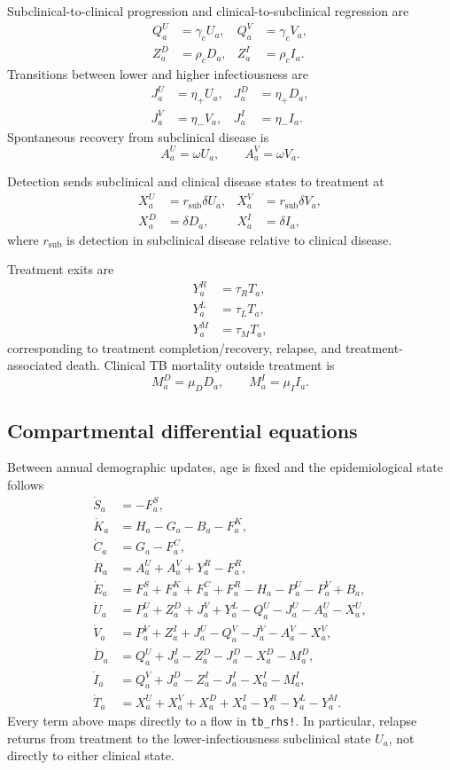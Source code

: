 \documentclass[11pt]{article}
\newcommand{\code}[1]{\texttt{#1}}
\begin{document}
Subclinical-to-clinical progression and clinical-to-subclinical regression are
\begin{align}
Q^U_a&=\gamma_cU_a,& Q^V_a&=\gamma_cV_a,\\
Z^D_a&=\rho_cD_a,& Z^I_a&=\rho_cI_a.
\end{align}
Transitions between lower and higher infectiousness are
\begin{align}
J^U_a&=\eta_+U_a,& J^D_a&=\eta_+D_a,\\
J^V_a&=\eta_-V_a,& J^I_a&=\eta_-I_a.
\end{align}
Spontaneous recovery from subclinical disease is
\begin{equation}
A^U_a=\omega U_a,\qquad A^V_a=\omega V_a.
\end{equation}

Detection sends subclinical and clinical disease states to treatment at
\begin{align}
X^U_a&=r_{\mathrm{sub}}\delta U_a,&
X^V_a&=r_{\mathrm{sub}}\delta V_a,\\
X^D_a&=\delta D_a,&
X^I_a&=\delta I_a,
\end{align}
where $r_{\mathrm{sub}}$ is detection in subclinical disease relative to clinical disease.

Treatment exits are
\begin{align}
Y^R_a&=\tau_R T_a,\\
Y^L_a&=\tau_L T_a,\\
Y^M_a&=\tau_M T_a,
\end{align}
corresponding to treatment completion/recovery, relapse, and treatment-associated death. Clinical TB mortality outside treatment is
\begin{equation}
M^D_a=\mu_DD_a,\qquad M^I_a=\mu_II_a.
\end{equation}

\subsection{Compartmental differential equations}

Between annual demographic updates, age is fixed and the epidemiological state follows
\begin{align}
\dot S_a &= -F^S_a,\\
\dot K_a &= H_a-G_a-B_a-F^K_a,\\
\dot C_a &= G_a-F^C_a,\\
\dot R_a &= A^U_a+A^V_a+Y^R_a-F^R_a,\\
\dot E_a &= F^S_a+F^K_a+F^C_a+F^R_a-H_a-P^U_a-P^V_a+B_a,\\
\dot U_a &= P^U_a+Z^D_a+J^V_a+Y^L_a-Q^U_a-J^U_a-A^U_a-X^U_a,\\
\dot V_a &= P^V_a+Z^I_a+J^U_a-Q^V_a-J^V_a-A^V_a-X^V_a,\\
\dot D_a &= Q^U_a+J^I_a-Z^D_a-J^D_a-X^D_a-M^D_a,\\
\dot I_a &= Q^V_a+J^D_a-Z^I_a-J^I_a-X^I_a-M^I_a,\\
\dot T_a &= X^U_a+X^V_a+X^D_a+X^I_a-Y^R_a-Y^L_a-Y^M_a.
\label{eq:odes}
\end{align}
Every term above maps directly to a flow in \code{tb\_rhs!}. In particular, relapse returns from treatment to the lower-infectiousness subclinical state $U_a$, not directly to either clinical state.
\end{document}
